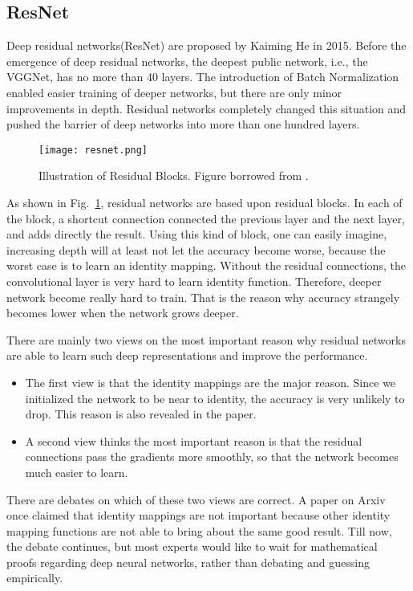\subsection{ResNet}
Deep residual networks\cite{he2016deep}(ResNet) are proposed by Kaiming He in 2015. Before the emergence of deep residual networks, the deepest public network, i.e., the VGGNet, has no more than 40 layers. The introduction of Batch Normalization enabled easier training of deeper networks, but there are only minor improvements in depth. Residual networks completely changed this situation and pushed the barrier of deep networks into more than one hundred layers. 
\begin{figure}[!htp]
	\centering
	\texttt{[image: resnet.png]}
	\caption[Illustration of Residual Blocks]
	{Illustration of Residual Blocks. Figure borrowed from \parencite{he2016deep}.}
	\label{fig:resnet}
\end{figure}

As shown in Fig.~\ref{fig:resnet}, residual networks are based upon residual blocks. In each of the block, a shortcut connection connected the previous layer and the next layer, and adds directly the result. Using this kind of block, one can easily imagine, increasing depth will at least not let the accuracy become worse, because the worst case is to learn an identity mapping. Without the residual connections, the convolutional layer is very hard to learn identity function. Therefore, deeper network become really hard to train. That is the reason why accuracy strangely becomes lower when the network grows deeper. 

There are mainly two views on the most important reason why residual networks are able to learn such deep representations and improve the performance.
\begin{itemize}
	\item The first view is that the identity mappings are the major reason. Since we initialized the network to be near to identity, the accuracy is very unlikely to drop. This reason is also revealed in the paper.
	\item A second view thinks the most important reason is that the residual connections pass the gradients more smoothly, so that the network becomes much easier to learn.
\end{itemize}
There are debates on which of these two views are correct. A paper on Arxiv once claimed that identity mappings are not important because other identity mapping functions are not able to bring about the same good result. Till now, the debate continues, but most experts would like to wait for mathematical proofs regarding deep neural networks, rather than debating and guessing empirically. 

